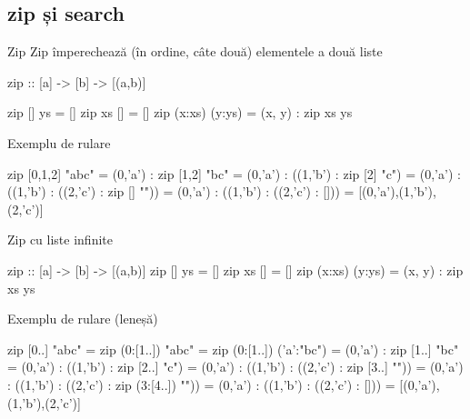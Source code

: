 \documentclass[handout,xcolor=pdftex,romanian,colorlinks]{beamer}
\begin{document}
\subsection{zip și search}
\begin{frame}[fragile]{Zip}
Zip împerechează (în ordine, câte două) elementele a două liste 
\begin{asciihs}
zip :: [a] -> [b] -> [(a,b)]
\end{asciihs}
\vspace{-2ex}
\begin{asciihs}
zip [] ys = []
zip xs [] = []
zip (x:xs) (y:ys) = (x, y) : zip xs ys
\end{asciihs}

\begin{block}{Exemplu de rulare}
\begin{asciihs}
zip [0,1,2] "abc"
  = (0,'a') : zip [1,2] "bc"
  = (0,'a') : ((1,'b') : zip [2] "c")
  = (0,'a') : ((1,'b') : ((2,'c') : zip [] ""))
  = (0,'a') : ((1,'b') : ((2,'c') : []))
  = [(0,'a'),(1,'b'),(2,'c')]
\end{asciihs}
\end{block}
\end{frame}

\begin{frame}[fragile]{Zip cu liste infinite}
\begin{asciihs}
zip :: [a] -> [b] -> [(a,b)]
zip [] ys = []
zip xs [] = []
zip (x:xs) (y:ys) = (x, y) : zip xs ys
\end{asciihs}

\begin{block}{Exemplu de rulare (leneșă)}
\begin{asciihs}
zip [0..] "abc"
  = zip (0:[1..]) "abc"
  = zip (0:[1..]) ('a':"bc")
  = (0,'a') : zip [1..] "bc"
  = (0,'a') : ((1,'b') : zip [2..] "c")
  = (0,'a') : ((1,'b') : ((2,'c') : zip [3..] ""))
  = (0,'a') : ((1,'b') : ((2,'c') : zip (3:[4..]) ""))
  = (0,'a') : ((1,'b') : ((2,'c') : []))
  = [(0,'a'),(1,'b'),(2,'c')]
\end{asciihs}
\end{block}

\end{frame}
\end{document}
